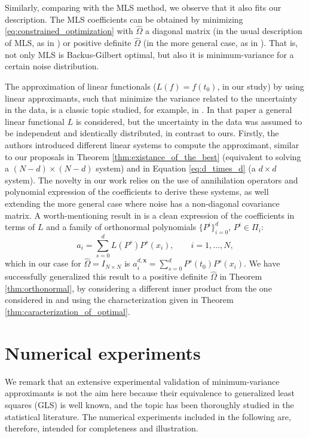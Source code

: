 \documentclass[preprint]{elsarticle}       %
\newcommand{\bx}{\bm{x}}
\theoremstyle{plain}
\theoremstyle{remark}
\begin{document}
Similarly, comparing with the MLS method, we observe that it also fits our description. The MLS coefficients can be obtained by minimizing \eqref{eq:constrained_optimization} with $\hat\Omega$ a diagonal matrix (in the usual description of MLS, as in \cite{Levin98}) or positive definite $\hat\Omega$ (in the more general case, as in \cite{BS89}). That is, not only MLS is Backus-Gilbert optimal, but also it is minimum-variance for a certain noise distribution.

The approximation of linear functionals ($L(f) = f(t_0)$, in our study) by using linear approximants, such that minimize the variance related to the uncertainty in the data, is a classic topic studied, for example, in \cite{CR76}. In that paper a general linear functional $L$ is considered, but the uncertainty in the data was assumed to be independent and identically distributed, in contrast to ours. Firstly, the authors introduced different linear systems to compute the approximant, similar to our proposals in Theorem \ref{thm:existance_of_the_best} (equivalent to solving a $(N-d)\times(N-d)$ system) and in Equation \eqref{eq:d_times_d} (a $d\times d$ system). The novelty in our work relies on the use of annihilation operators and polynomial expression of the coefficients to derive these systems, as well extending the more general case where noise has a non-diagonal covariance matrix. A worth-mentioning result in \cite{CR76} is a clean expression of the coefficients in terms of $L$ and a family of orthonormal polynomials $\{P^i\}_{i=0}^d$, $P^i\in\Pi_i$:
\[
    a_i = \sum_{s=0}^d L(P^s) P^s(x_i), \qquad i=1,\ldots,N,
\]
which in our case for $\hat\Omega=I_{N\times N}$ is
\(
    a_i^{d,\bx} = \sum_{s=0}^d P^s(t_0) P^s(x_i).
\)
We have successfully generalized this result to a positive definite $\hat\Omega$ in Theorem \ref{thm:orthonormal}, by considering a different inner product from the one considered in \cite{CR76} and using the characterization given in Theorem \ref{thm:caracterization_of_optimal}.

\section{Numerical experiments}\label{numericalexp}

We remark that an extensive experimental validation of minimum-variance approximants is not the aim here because their equivalence to generalized least squares (GLS) is well known, and the topic has been thoroughly studied in the statistical literature. The numerical experiments included in the following are, therefore, intended for completeness and illustration.
\end{document}

